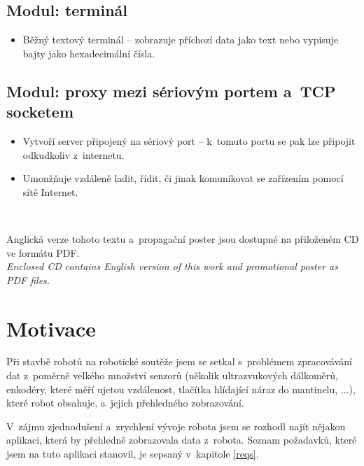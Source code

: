 \documentclass[12pt, a4paper, oneside]{article}
\newcommand{\It}{\textit}  %
\begin{document}
\subsection*{Modul: terminál}
\begin{itemize}
    \item Běžný textový terminál -- zobrazuje příchozí data jako text nebo vypisuje bajty jako hexadecimální čísla.
\end{itemize}

\subsection*{Modul: proxy mezi sériovým portem a~TCP socketem}
\begin{itemize}
    \item Vytvoří server připojený na sériový port -- k~tomuto portu se pak lze připojit odkudkoliv z~internetu.
    \item Umonžňuje vzdáleně ladit, řídit, či jinak komunikovat se zařízením pomocí sítě Internet.
\end{itemize}
~
\vspace{5mm}

\noindent Anglická verze tohoto textu a~propagační poster jsou dostupné na přiloženém CD ve formátu PDF.\\
\noindent\It{Enclosed CD contains English version of this work and promotional poster as PDF files.}

\section{Motivace}
\label{motivace}
Při stavbě robotů na robotické soutěže jsem se setkal s~problémem zpracovávání dat z~poměrně velkého množství senzorů (několik ultrazvukových dálkoměrů, enkodéry, které měří ujetou vzdálenost, tlačítka hlídající náraz do mantinelu, ...), které robot obsahuje, a~jejich přehledného zobrazování. 

V~zájmu zjednodušení a~zrychlení vývoje robota jsem se rozhodl najít nějakou aplikaci, která by přehledně zobrazovala data z~robota. Seznam požadavků, které jsem na tuto aplikaci stanovil, je sepsaný v~kapitole \ref{reqs}.
\end{document}
